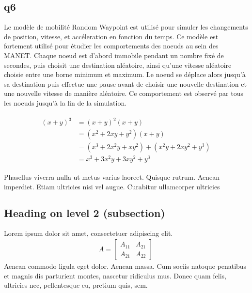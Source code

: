 \documentclass[paper=a4, fontsize=11pt]{scrartcl} %
\numberwithin{equation}{section} %
\numberwithin{figure}{section} %
\numberwithin{table}{section} %
\begin{document}
\subsection{q6}

Le modèle de mobilité Random Waypoint est utilisé pour simuler les changements de position, vitesse, et accéleration en fonction du temps. Ce modèle est fortement utilisé
pour étudier les comportements des noeuds au sein des MANET. Chaque noeud est d'abord immobile pendant un nombre fixé de secondes, puis choisit une destination aléatoire, ainsi qu'une vitesse aléatoire choisie entre une borne
minimum et maximum. Le noeud se déplace alors jusqu'à sa destination puis effectue une pause avant de choisir une nouvelle destination et une nouvelle vitesse de manière aléatoire. Ce comportement est observé par tous les noeuds jusqu'à 
la fin de la simulation.

\lipsum[2] %

\begin{align} 
\begin{split}
(x+y)^3 	&= (x+y)^2(x+y)\\
&=(x^2+2xy+y^2)(x+y)\\
&=(x^3+2x^2y+xy^2) + (x^2y+2xy^2+y^3)\\
&=x^3+3x^2y+3xy^2+y^3
\end{split}					
\end{align}

Phasellus viverra nulla ut metus varius laoreet. Quisque rutrum. Aenean imperdiet. Etiam ultricies nisi vel augue. Curabitur ullamcorper ultricies


\subsection{Heading on level 2 (subsection)}

Lorem ipsum dolor sit amet, consectetuer adipiscing elit. 
\begin{align}
A = 
\begin{bmatrix}
A_{11} & A_{21} \\
A_{21} & A_{22}
\end{bmatrix}
\end{align}
Aenean commodo ligula eget dolor. Aenean massa. Cum sociis natoque penatibus et magnis dis parturient montes, nascetur ridiculus mus. Donec quam felis, ultricies nec, pellentesque eu, pretium quis, sem.

\end{document}
